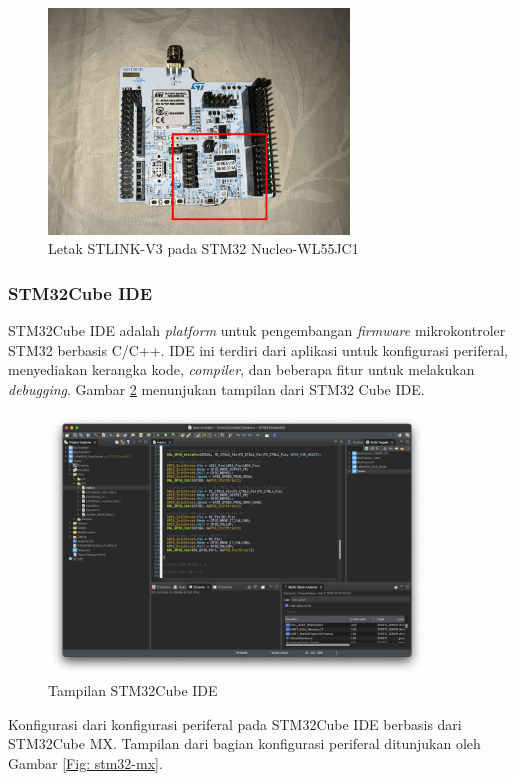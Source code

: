 \begin{figure}[ht]
	\centering
	\includegraphics[width=8cm]{contents/chapter-2/stlink-in-wl55.jpg}
	\caption{Letak STLINK-V3 pada STM32 Nucleo-WL55JC1}
	\label{Fig: stlink-in-wl55}
\end{figure}

\subsubsection{STM32Cube IDE}
STM32Cube IDE adalah \textit{platform} untuk pengembangan \textit{firmware} mikrokontroler STM32 berbasis C/C++. IDE ini terdiri dari aplikasi untuk konfigurasi periferal, menyediakan kerangka kode, \textit{compiler}, dan beberapa fitur untuk melakukan \textit{debugging}. Gambar \ref{Fig: stm32-ide} menunjukan tampilan dari STM32 Cube IDE.

\begin{figure}[ht]
	\centering
	\includegraphics[width=10cm]{contents/chapter-2/stm32-ide.png}
	\caption{Tampilan STM32Cube IDE}
	\label{Fig: stm32-ide}
\end{figure}

Konfigurasi dari konfigurasi periferal pada STM32Cube IDE berbasis dari STM32Cube MX. Tampilan dari bagian konfigurasi periferal ditunjukan oleh Gambar \ref{Fig: stm32-mx}.

